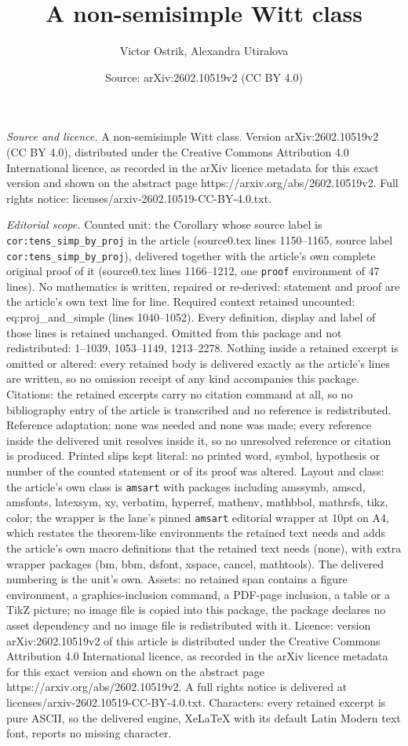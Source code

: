 \documentclass[10pt,a4paper]{amsart}
\title[A non-semisimple Witt class]{A non-semisimple Witt class}
\author{Victor Ostrik, Alexandra Utiralova}
\date{Source: arXiv:2602.10519v2 (CC BY 4.0)}
\begin{document}
\maketitle

\noindent\emph{Source and licence.} A non-semisimple Witt class. Version arXiv:2602.10519v2 (CC BY 4.0), distributed under the Creative Commons Attribution 4.0 International licence, as recorded in the arXiv licence metadata for this exact version and shown on the abstract page https://arxiv.org/abs/2602.10519v2. Full rights notice: licenses/arxiv-2602.10519-CC-BY-4.0.txt.\par\smallskip

\noindent\textit{Editorial scope.} Counted unit: the Corollary whose source label is \texttt{cor:tens\_simp\_by\_proj} in the article (source0.tex lines 1150--1165, source label \texttt{cor:tens\_simp\_by\_proj}), delivered together with the article's own complete original proof of it (source0.tex lines 1166--1212, one \texttt{proof} environment of 47 lines). No mathematics is written, repaired or re-derived: statement and proof are the article's own text line for line. Required context retained uncounted: eq:proj\_and\_simple (lines 1040--1052). Every definition, display and label of those lines is retained unchanged. Omitted from this package and not redistributed: 1--1039, 1053--1149, 1213--2278. Nothing inside a retained excerpt is omitted or altered: every retained body is delivered exactly as the article's lines are written, so no omission receipt of any kind accompanies this package. Citations: the retained excerpts carry no citation command at all, so no bibliography entry of the article is transcribed and no reference is redistributed. Reference adaptation: none was needed and none was made; every reference inside the delivered unit resolves inside it, so no unresolved reference or citation is produced. Printed slips kept literal: no printed word, symbol, hypothesis or number of the counted statement or of its proof was altered. Layout and class: the article's own class is \texttt{amsart} with packages including amssymb, amscd, amsfonts, latexsym, xy, verbatim, hyperref, mathenv, mathbbol, mathrsfs, tikz, color; the wrapper is the lane's pinned \texttt{amsart} editorial wrapper at 10pt on A4, which restates the theorem-like environments the retained text needs and adds the article's own macro definitions that the retained text needs (none), with extra wrapper packages (bm, bbm, dsfont, xspace, cancel, mathtools). The delivered numbering is the unit's own. Assets: no retained span contains a figure environment, a graphics-inclusion command, a PDF-page inclusion, a table or a TikZ picture; no image file is copied into this package, the package declares no asset dependency and no image file is redistributed with it. Licence: version arXiv:2602.10519v2 of this article is distributed under the Creative Commons Attribution 4.0 International licence, as recorded in the arXiv licence metadata for this exact version and shown on the abstract page https://arxiv.org/abs/2602.10519v2. A full rights notice is delivered at licenses/arxiv-2602.10519-CC-BY-4.0.txt. Characters: every retained excerpt is pure ASCII, so the delivered engine, XeLaTeX with its default Latin Modern text font, reports no missing character.
\end{document}
